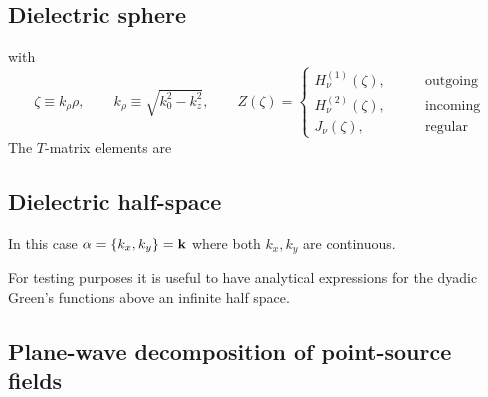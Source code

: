 \documentclass[letterpaper]{article}
\begin{document}
\subsection{Dielectric sphere}
%
%
%
%
with
$$ 
 \zeta \equiv k_\rho \rho,
 \qquad
 k_\rho\equiv \sqrt{k_0^2 - k_z^2},
 \qquad
 Z(\zeta) =
 \begin{cases}
   H^{(1)}_\nu(\zeta), \qquad &\text{outgoing} \\
   H^{(2)}_\nu(\zeta), \qquad &\text{incoming} \\
   J_\nu      (\zeta), \qquad &\text{regular}
 \end{cases}
$$
The $T$-matrix elements are 

\subsection{Dielectric half-space}

In this case $\alpha=\{k_x, k_y\}=\mathbf{k}$ where
both $k_x, k_y$ are continuous.

For testing purposes it is useful to have analytical expressions
for the dyadic Green's functions above an infinite half space.

\subsection*{Plane-wave decomposition of point-source fields}
\end{document}
